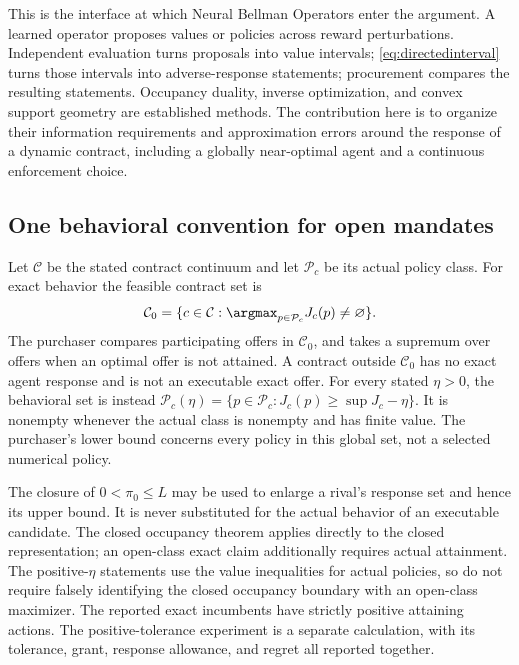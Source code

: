 This is the interface at which Neural Bellman Operators enter the argument. A learned operator proposes values or policies across reward perturbations. Independent evaluation turns proposals into value intervals; \eqref{eq:directedinterval} turns those intervals into adverse-response statements; procurement compares the resulting statements. Occupancy duality, inverse optimization, and convex support geometry are established methods. The contribution here is to organize their information requirements and approximation errors around the response of a dynamic contract, including a globally near-optimal agent and a continuous enforcement choice.

\subsection{One behavioral convention for open mandates}
\label{sec:globalbehavior}
Let $\mathcal C$ be the stated contract continuum and let $\mathcal P_c$ be its actual policy class. For exact behavior the feasible contract set is
\[
 \mathcal C_0=\{c\in\mathcal C:\argmax_{p\in\mathcal P_c}J_c(p)\ne\varnothing\}.
\]
The purchaser compares participating offers in $\mathcal C_0$, and takes a supremum over offers when an optimal offer is not attained. A contract outside $\mathcal C_0$ has no exact agent response and is not an executable exact offer. For every stated $\eta>0$, the behavioral set is instead
$\mathcal P_c(\eta)=\{p\in\mathcal P_c:J_c(p)\geq\sup J_c-\eta\}$.
It is nonempty whenever the actual class is nonempty and has finite value. The purchaser's lower bound concerns every policy in this global set, not a selected numerical policy.

The closure of $0<\pi_0\leq L$ may be used to enlarge a rival's response set and hence its upper bound. It is never substituted for the actual behavior of an executable candidate. The closed occupancy theorem applies directly to the closed representation; an open-class exact claim additionally requires actual attainment. The positive-$\eta$ statements use the value inequalities for actual policies, so do not require falsely identifying the closed occupancy boundary with an open-class maximizer. The reported exact incumbents have strictly positive attaining actions. The positive-tolerance experiment is a separate calculation, with its tolerance, grant, response allowance, and regret all reported together.


